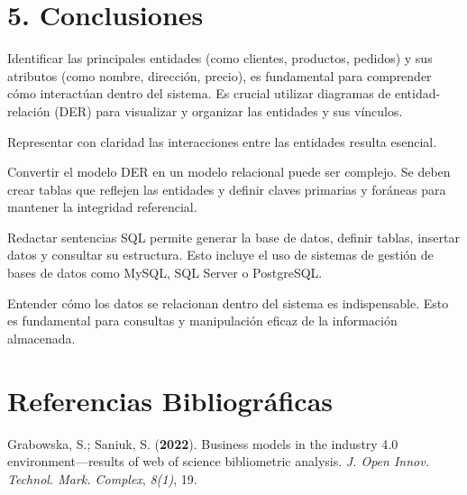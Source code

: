 \documentclass{article}
\begin{document}
\section{5. Conclusiones}
  Identificar las principales entidades (como clientes, productos, pedidos) y sus atributos (como nombre, dirección, precio), es fundamental para comprender cómo interactúan dentro del sistema. Es crucial utilizar diagramas de entidad-relación (DER) para visualizar y organizar las entidades y sus vínculos.
  
  Representar con claridad las interacciones entre las entidades resulta esencial.
  
  Convertir el modelo DER en un modelo relacional puede ser complejo. Se deben crear tablas que reflejen las entidades y definir claves primarias y foráneas para mantener la integridad referencial.
  
  Redactar sentencias SQL permite generar la base de datos, definir tablas, insertar datos y consultar su estructura. Esto incluye el uso de sistemas de gestión de bases de datos como MySQL, SQL Server o PostgreSQL.
  
  Entender cómo los datos se relacionan dentro del sistema es indispensable. Esto es fundamental para consultas y manipulación eficaz de la información almacenada.
    
    \newpage
    
\section{Referencias Bibliográficas}
    \begin{thebibliography}{100}
Grabowska, S.; Saniuk, S. ({\bf 2022}). Business models in the industry 4.0 environment—results of web of science bibliometric analysis. {\em J. Open Innov. Technol. Mark. Complex}, {\em 8(1)}, 19.
    \end{thebibliography}
\end{document}
